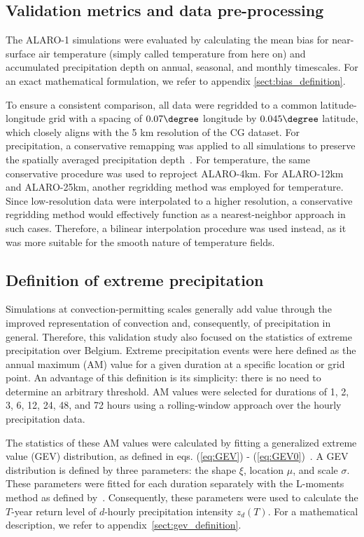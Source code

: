\documentclass[journal abbreviation, manuscript]{copernicus}
\begin{document}
\subsection{Validation metrics and data pre-processing}

The ALARO-1 simulations were evaluated by calculating the mean bias for near-surface air temperature (simply called temperature from here on) and accumulated precipitation depth on annual, seasonal, and monthly timescales. 
For an exact mathematical formulation, we refer to appendix \ref{sect:bias_definition}.

To ensure a consistent comparison, all data were regridded to a common latitude-longitude grid with a spacing of $0.07\degree$ longitude by $0.045\degree$ latitude, which closely aligns with the 5 km resolution of the CG dataset. 
For precipitation, a conservative remapping was applied to all simulations to preserve the spatially averaged precipitation depth~\citep{jones_first-_1999}. 
For temperature, the same conservative procedure was used to reproject ALARO-4km. 
For ALARO-12km and ALARO-25km, another regridding method was employed for temperature.
Since low-resolution data were interpolated to a higher resolution, a conservative regridding method would effectively function as a nearest-neighbor approach in such cases.
Therefore, a bilinear interpolation procedure was used instead, as it was more suitable for the smooth nature of temperature fields.

\subsection{Definition of extreme precipitation}
\label{sect:methods extreme precipitation}

Simulations at convection-permitting scales generally add value through the improved representation of convection and, consequently, of precipitation in general. 
Therefore, this validation study also focused on the statistics of extreme precipitation over Belgium. 
Extreme precipitation events were here defined as the annual maximum (AM) value for a given duration at a specific location or grid point. 
An advantage of this definition is its simplicity: there is no need to determine an arbitrary threshold. 
AM values were selected for durations of 1, 2, 3, 6, 12, 24, 48, and 72 hours using a rolling-window approach over the hourly precipitation data. 

The statistics of these AM values were calculated by fitting a generalized extreme value (GEV) distribution, as defined in eqs. (\ref{eq:GEV}) - (\ref{eq:GEV0})~\citep{coles_introduction_2001}. 
A GEV distribution is defined by three parameters: the shape $\xi$, location $\mu$, and scale $\sigma$. 
These parameters were fitted for each duration separately with the L-moments method as defined by~\cite{hosking_l-moments_1990}. 
Consequently, these parameters were used to calculate the $T$-year return level of $d$-hourly precipitation intensity $z_d(T)$. 
For a mathematical description, we refer to appendix~\ref{sect:gev_definition}.
\end{document}
